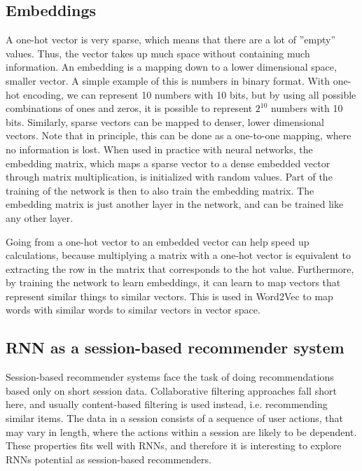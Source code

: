 \subsection{Embeddings}
\label{sec:embeddings}
A one-hot vector is very sparse, which means that there are a lot of ''empty'' values. Thus, the vector takes up much space without containing much information. An embedding is a mapping down to a lower dimensional space, smaller vector. A simple example of this is numbers in binary format. With one-hot encoding, we can represent 10 numbers with 10 bits, but by using all possible combinations of ones and zeros, it is possible to represent $2^10$ numbers with 10 bits. Similarly, sparse vectors can be mapped to denser, lower dimensional vectors. Note that in principle, this can be done as a one-to-one mapping, where no information is lost. When used in practice with neural networks, the embedding matrix, which maps a sparse vector to a dense embedded vector through matrix multiplication, is initialized with random values. Part of the training of the network is then to also train the embedding matrix. The embedding matrix is just another layer in the network, and can be trained like any other layer.

Going from a one-hot vector to an embedded vector can help speed up calculations, because multiplying a matrix with a one-hot vector is equivalent to extracting the row in the matrix that corresponds to the hot value. Furthermore, by training the network to learn embeddings, it can learn to map vectors that represent similar things to similar vectors. This is used in Word2Vec \cite{DBLP:journals/corr/abs-1301-3781} to map words with similar words to similar vectors in vector space.


\subsection{RNN as a session-based recommender system}
Session-based recommender systems face the task of doing recommendations based only on short session data. Collaborative filtering approaches fall short here, and usually content-based filtering is used instead, i.e. recommending similar items. The data in a session consists of a sequence of user actions, that may vary in length, where the actions within a session are likely to be dependent. These properties fits well with RNNs, and therefore it is interesting to explore RNNs potential as session-based recommenders.

